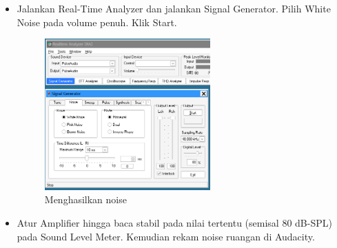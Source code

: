 \documentclass{article}
\begin{document}
\begin{itemize}
		\item Jalankan Real-Time Analyzer dan jalankan Signal Generator.
		Pilih White Noise pada volume penuh. Klik Start.
		
		\begin{figure}[H]
			\centering
			\includegraphics[width=0.6\textwidth,angle=0]{images/rta_noise_gen}
			\caption{Menghasilkan noise}
		\end{figure}
	
		\item Atur Amplifier hingga baca stabil pada nilai tertentu (semisal 80 dB-SPL) pada Sound Level Meter.
		Kemudian rekam noise ruangan di Audacity.
		

\end{itemize}
\end{document}
